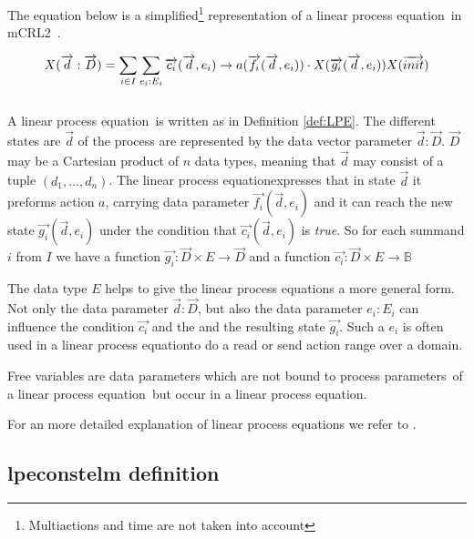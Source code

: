 \documentclass[a4paper,10pt]{article}
\newcommand{\lpe}{linear process equation}
\newcommand{\ovr}{\overrightarrow}
\newcommand{\mcrl}{mCRL2}
\newcommand{\pps}{process parameters}
\newcommand{\ti}{\textit}
\begin{document}
The equation below is a simplified\footnote{Multiactions and time are not taken into account} representation of a \lpe\ in \mcrl\ .
\begin{defn}[\lpe]\label{def:LPE}
\begin{displaymath}
X (\ovr{d}:\ovr{D}) = \sum_{i \in I} \sum_{e_i:E_i} \ovr{c_i} ( \ovr{d}, e_i ) \rightarrow a(\ovr{f_i}(\ovr{d},e_i)) \cdot X(\ovr{g_i}(\ovr{d},e_i)) $$
$$ X(\ovr{init})
\end{displaymath}\\
A \lpe\ is written as in Definition \ref{def:LPE}. The different states are $\ovr{d}$ of the process are represented by the data vector parameter $\ovr{d}:\ovr{D}$. $\ovr{D}$ may be a Cartesian product of $n$ data types, meaning that $\ovr{d}$ may consist of a tuple $(d_1, \ldots, d_n)$. The \lpe expresses that in state $\ovr{d}$ it preforms action $a$, carrying data parameter $\ovr{f_i}(\ovr{d},e_i)$ and it can reach the new state $\ovr{g_i}(\ovr{d},e_i)$ under the condition that $\ovr{c_i}(\ovr{d},e_i)$ is \ti{true}. So for each summand $i$ from $I$ we have a function $\ovr{g_i}: \ovr{D} \times E \rightarrow \ovr{D}$ and a function $\ovr{c_i}: \ovr{D} \times E \rightarrow \mathbb{B}$

The data type $E$ helps to give the \lpe s a more general form. Not only the data parameter $\ovr{d}:\ovr{D}$, but also the data parameter $e_i: E_i$ can influence the condition $\ovr{c_i}$ and the and the resulting state $\ovr{g_i}$. Such a $e_i$ is often used in a \lpe to do a read or send action range over a domain. 

Free variables are data parameters which are not bound to \pps\ of a \lpe\ but occur in a \lpe .

For an more detailed explanation of \lpe s  we refer to \cite{LPE_info}.
\end{defn}

\subsection{lpeconstelm definition}\label{subsec:lpedef}
\end{document}
